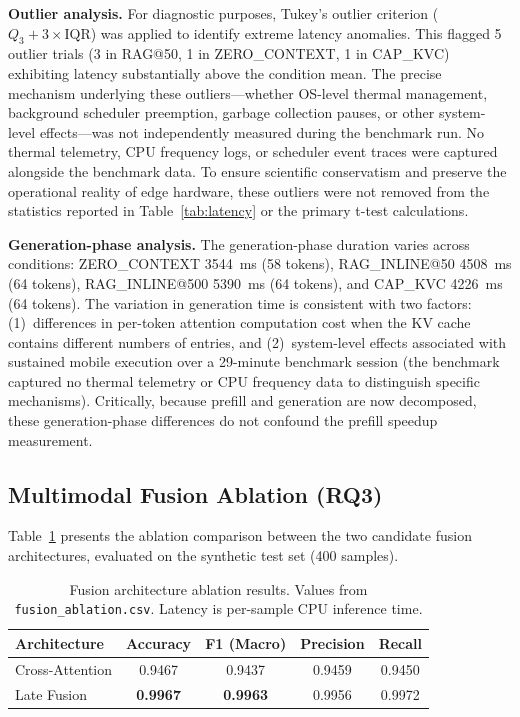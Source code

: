 \documentclass[journal]{IEEEtran}
\begin{document}
\textbf{Outlier analysis.} For diagnostic purposes, Tukey's outlier criterion ($Q_3 + 3 \times \text{IQR}$) was applied to identify extreme latency anomalies. This flagged 5 outlier trials (3 in RAG@50, 1 in ZERO\_CONTEXT, 1 in CAP\_KVC) exhibiting latency substantially above the condition mean. The precise mechanism underlying these outliers---whether OS-level thermal management, background scheduler preemption, garbage collection pauses, or other system-level effects---was not independently measured during the benchmark run. No thermal telemetry, CPU frequency logs, or scheduler event traces were captured alongside the benchmark data. To ensure scientific conservatism and preserve the operational reality of edge hardware, these outliers were not removed from the statistics reported in Table~\ref{tab:latency} or the primary t-test calculations.

\textbf{Generation-phase analysis.} The generation-phase duration varies across conditions: ZERO\_CONTEXT 3544~ms (58 tokens), RAG\_INLINE@50 4508~ms (64 tokens), RAG\_INLINE@500 5390~ms (64 tokens), and CAP\_KVC 4226~ms (64 tokens). The variation in generation time is consistent with two factors: (1)~differences in per-token attention computation cost when the KV cache contains different numbers of entries, and (2)~system-level effects associated with sustained mobile execution over a 29-minute benchmark session (the benchmark captured no thermal telemetry or CPU frequency data to distinguish specific mechanisms). Critically, because prefill and generation are now decomposed, these generation-phase differences do not confound the prefill speedup measurement.

\subsection{Multimodal Fusion Ablation (RQ3)}
\label{sec:results_fusion}

Table~\ref{tab:fusion} presents the ablation comparison between the two candidate fusion architectures, evaluated on the synthetic test set (400 samples).

\begin{table}[htbp]
\centering
\caption{Fusion architecture ablation results. Values from \texttt{fusion\_ablation.csv}. Latency is per-sample CPU inference time.}
\label{tab:fusion}
\begin{tabular}{lcccc}
\hline
\textbf{Architecture} & \textbf{Accuracy} & \textbf{F1 (Macro)} & \textbf{Precision} & \textbf{Recall} \\
\hline
Cross-Attention & 0.9467 & 0.9437 & 0.9459 & 0.9450 \\
Late Fusion     & \textbf{0.9967} & \textbf{0.9963} & 0.9956 & 0.9972 \\
\hline
\end{tabular}
\end{table}
\end{document}
